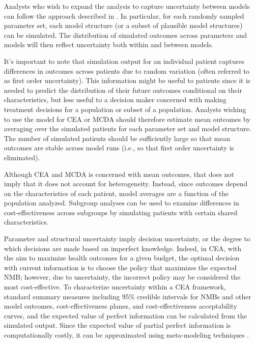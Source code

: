\documentclass[11pt,final,fleqn]{article}\usepackage[]{graphicx}\usepackage[]{color}
\theoremstyle{plain}
\begin{document}
Analysts who wish to expand the analysis to capture uncertainty between models can follow the approach described in \citet{bojke2009characterizing}. In particular, for each randomly sampled parameter set, each model structure (or a subset of plausible model structures) can be simulated. The distribution of simulated outcomes across parameters and models will then reflect uncertainty both within and between models. 

It's important to note that simulation output for an individual patient captures differences in outcomes across patients due to random variation (often referred to as first order uncertainty). This information might be useful to patients since it is needed to predict the distribution of their future outcomes conditional on their characteristics, but less useful to a decision maker concerned with making treatment decisions for a population or subset of a population. Analysts wishing to use the model for CEA or MCDA should therefore estimate mean outcomes by averaging over the simulated patients for each parameter set and model structure. The number of simulated patients should be sufficiently large so that mean outcomes are stable across model runs (i.e., so that first order uncertainty is eliminated). 

Although CEA and MCDA is concerned with mean outcomes, that does not imply that it does not account for heterogeneity. Instead, since outcomes depend on the characteristics of each patient, model averages are a function of the population analyzed. Subgroup analyses can be used to examine differences in cost-effectiveness across subgroups by simulating patients with certain shared characteristics. 

Parameter and structural uncertainty imply decision uncertainty, or the degree to which decisions are made based on imperfect knowledge. Indeed, in CEA, with the aim to maximize health outcomes for a given budget, the optimal decision with current information is to choose the policy that maximizes the expected NMB; however, due to uncertainty, the incorrect policy may be considered the most cost-effective. To characterize uncertainty within a CEA framework, standard summary measures including 95\% credible intervals for NMBs and other model outcomes, cost-effectiveness planes, and cost-effectiveness acceptability curves, and the expected value of perfect information can be calculated from the simulated output. Since the expected value of partial perfect information is computationally costly, it can be approximated using meta-modeling techniques \citep{jalal2013linear, jalal2015computing, heath2016estimating}.
\end{document}
